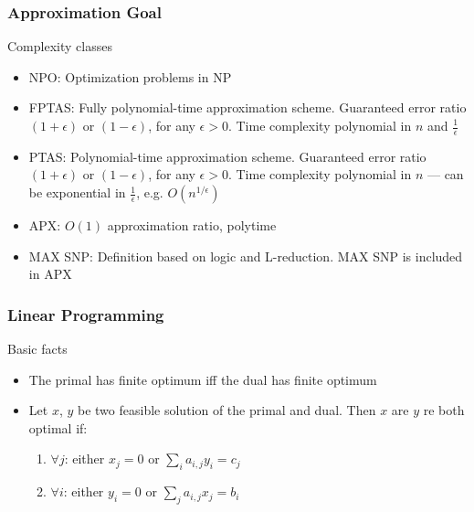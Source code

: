 \documentclass[12pt,aspectratio=169]{beamer}
\begin{document}

\begin{frame}\frametitle{Approximation Goal }
  \begin{block}{Complexity classes}
    \begin{itemize}
    \item
      NPO: Optimization problems in NP
    \item
      FPTAS: Fully polynomial-time approximation scheme.
%
      Guaranteed error ratio $(1+\epsilon)$ or $(1-\epsilon)$, for any $\epsilon > 0$.
%
      Time complexity polynomial in $n$ and $\frac{1}{\epsilon}$
    \item
      PTAS: Polynomial-time approximation scheme.
%
      Guaranteed error ratio $(1+\epsilon)$ or $(1-\epsilon)$, for any $\epsilon > 0$.
%
      Time complexity polynomial in $n$ --- can be exponential in $\frac{1}{\epsilon}$,
      e.g. $O(n^{1/\epsilon})$
    \item
      APX: $O(1)$ approximation ratio, polytime
    \item
      MAX SNP: Definition based on logic and L-reduction.
%
      MAX SNP is included in APX
    \end{itemize}
  \end{block}
\end{frame}

\begin{frame}\frametitle{Linear Programming }
  \begin{block}{Basic facts}
    \begin{itemize}
    \item
      The primal has finite optimum iff the dual has finite optimum
    \item
      Let $x$, $y$ be two feasible solution of the primal and dual.
%
      Then $x$ are $y$ re both optimal if:
      \begin{enumerate}
      \item
        $\forall j$: either $x_{j}=0$ or $\sum_{i} a_{i,j}y_{i} = c_{j}$
      \item
        $\forall i$: either $y_{i}=0$ or $\sum_{j} a_{i,j}x_{j} = b_{i}$
      \end{enumerate}
    \end{itemize}
  \end{block}
\end{frame}
\end{document}
